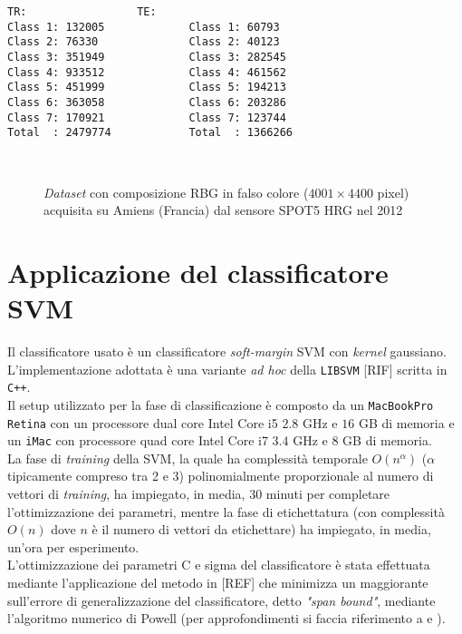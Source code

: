 \begin{lstlisting}[float=b,title={Distribuzione dei pixel di training(TR) e test(TE) classe per classe.},
                   label=lst:esempio, frame=lines]
TR:					TE:
Class 1: 132005				Class 1: 60793
Class 2: 76330				Class 2: 40123
Class 3: 351949				Class 3: 282545
Class 4: 933512				Class 4: 461562
Class 5: 451999				Class 5: 194213
Class 6: 363058				Class 6: 203286
Class 7: 170921				Class 7: 123744
Total  : 2479774			Total  : 1366266
\end{lstlisting}
\clearpage

\begin{figure}[!ht]
   \center
   \\%
     \hspace{4mm}
    \caption{\emph{Dataset} con composizione RBG in falso colore ($4001\times4400$ pixel) acquisita su Amiens (Francia) dal sensore \textsc{SPOT5 HRG} nel 2012}
    \label{fig: Amiens122_5m}
  \end{figure}
\clearpage

\section{Applicazione del classificatore SVM}
Il classificatore usato è un classificatore \emph{soft-margin} SVM con \emph{kernel} gaussiano. L'implementazione adottata è una variante \emph{ad hoc} della \texttt{LIBSVM} [RIF] scritta in \texttt{C++}.\\
Il setup utilizzato per la fase di classificazione è composto da un \texttt{MacBookPro Retina} con un processore dual core Intel Core i5 $2.8$ GHz e $16$ GB di memoria e un \texttt{iMac} con processore quad core Intel Core i7 $3.4$ GHz e $8$ GB di memoria. \\

La fase di \emph{training} della SVM, la quale ha complessità temporale $O(n^\alpha)$ ($\alpha$ tipicamente compreso tra 2 e 3) polinomialmente proporzionale al numero di vettori di \emph{training}, ha impiegato, in media, 30 minuti per completare l'ottimizzazione dei parametri, mentre la fase di etichettatura (con complessità $O(n)$ dove $n$ è il numero di vettori da etichettare) ha impiegato, in media, un'ora per esperimento.\\
L'ottimizzazione dei parametri C e sigma del classificatore è stata effettuata mediante l'applicazione del metodo in [REF] che minimizza un maggiorante sull'errore di generalizzazione del classificatore, detto \emph{"span bound"}, mediante l'algoritmo numerico di Powell (per approfondimenti si faccia riferimento a \citep{art_ottsvm1} e \citep{art_ottsvm2}).


